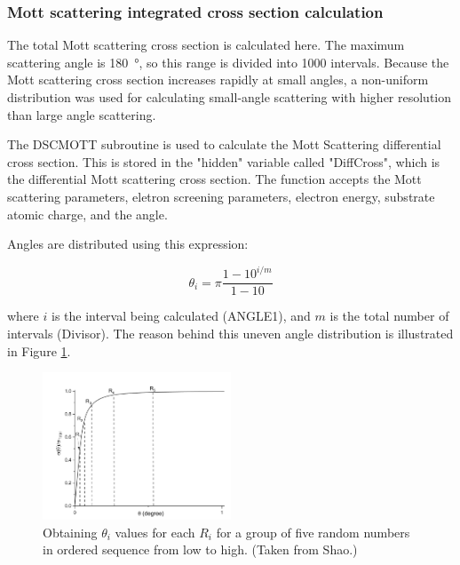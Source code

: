 \documentclass[10pt, reqno]{exam}
\begin{document}
\subsubsection{Mott scattering integrated cross section calculation}

The total Mott scattering cross section is calculated here. The maximum scattering angle is \SI{180}{\degree}, so this range is divided into 1000 intervals. Because the Mott scattering cross section increases rapidly at small angles, a non-uniform distribution was used for calculating small-angle scattering with higher resolution than large angle scattering. \par

The DSCMOTT subroutine is used to calculate the Mott Scattering differential cross section. This is stored in the "hidden" variable called "DiffCross", which is the differential Mott scattering cross section. The function accepts the Mott scattering parameters, eletron screening parameters, electron energy, substrate atomic charge, and the angle. \par

Angles are distributed using this expression:

\begin{equation}
    \theta_i = \pi\frac{1 - 10^{i/m}}{1 - 10}
    \label{eq:angle distribution}
\end{equation}

where $i$ is the interval being calculated (ANGLE1), and $m$ is the total number of intervals (Divisor). The reason behind this uneven angle distribution is illustrated in Figure \ref{fig:shao angle distribution}. \par

\begin{figure}
    \centering
    \includegraphics[width = 0.5\textwidth]{figures/shao angle distribution.png}
    \caption{Obtaining $\theta_i$ values for each $R_i$ for a group of five random numbers in ordered sequence from low to high. (Taken from Shao.)}
    \label{fig:shao angle distribution}
\end{figure}
\end{document}

